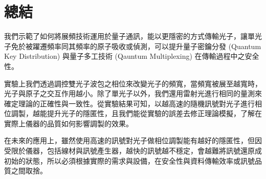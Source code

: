 \documentclass[class=NCU_thesis, crop=false]{standalone}
\begin{document}
\chapter{總結}
我們示範了如何將展頻技術運用於量子通訊，能以更隱密的方式傳輸光子，讓單光子免於被躍遷頻率同其頻率的原子吸收或偵測，可以提升量子密鑰分發 (Quantum Key Distribution) 與量子多工技術 (Qauntum Multiplexing) 在傳輸過程中之安全性。

實驗上我們透過調控雙光子波包之相位來改變光子的頻寬，當頻寬被展至越寬時，光子與原子之交互作用越小。除了單光子以外，我們還用雷射光進行相同的量測來確定理論的正確性與一致性。從實驗結果可知，以越高速的隨機訊號對光子進行相位調製，越能提升光子的隱匿性，且我們能從實驗的誤差去修正理論模擬，了解在實際上儀器的品質如何影響調製的效果。

在未來的應用上，雖然使用高速的訊號對光子做相位調製能有越好的隱匿性，但因受限於儀器，包括線材與訊號產生器，越快的訊號越不穩定，會越難將訊號還原成初始的狀態，所以必須根據實際的需求與設備，在安全性與資料傳輸效率或訊號品質之間取捨。
\end{document}
